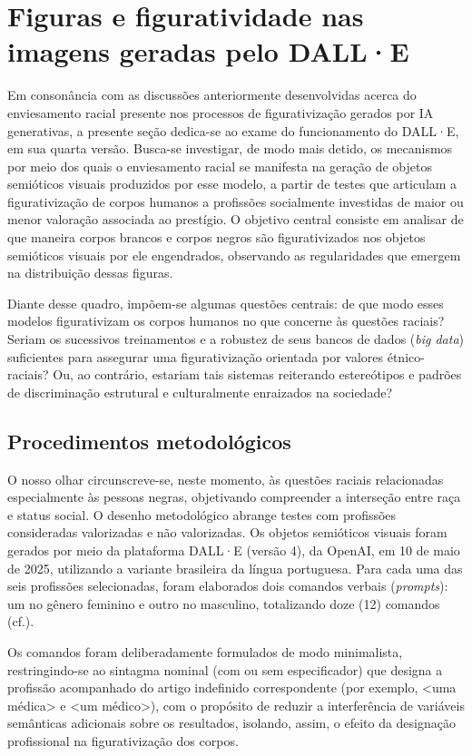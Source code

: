 \documentclass[portuguese]{textolivre}
\begin{document}
\section{Figuras e figuratividade nas imagens geradas pelo DALL·E}
Em consonância com as discussões anteriormente desenvolvidas acerca do enviesamento racial presente nos processos de figurativização gerados por IA generativas, a presente seção dedica-se ao exame do funcionamento do DALL·E, em sua quarta versão. Busca-se investigar, de modo mais detido, os mecanismos por meio dos quais o enviesamento racial se manifesta na geração de objetos semióticos visuais produzidos por esse modelo, a partir de testes que articulam a figurativização de corpos humanos a profissões socialmente investidas de maior ou menor valoração associada ao prestígio. O objetivo central consiste em analisar de que maneira corpos brancos e corpos negros são figurativizados nos objetos semióticos visuais por ele engendrados, observando as regularidades que emergem na distribuição dessas figuras.

Diante desse quadro, impõem-se algumas questões centrais: de que modo esses modelos figurativizam os corpos humanos no que concerne às questões raciais? Seriam os sucessivos treinamentos e a robustez de seus bancos de dados (\textit{big data}) suficientes para assegurar uma figurativização orientada por valores étnico-raciais? Ou, ao contrário, estariam tais sistemas reiterando estereótipos e padrões de discriminação estrutural e culturalmente enraizados na sociedade?


\subsection{Procedimentos metodológicos}

O nosso olhar circunscreve-se, neste momento, às questões raciais relacionadas especialmente às pessoas negras, objetivando compreender a interseção entre raça e status social. O desenho metodológico abrange testes com profissões consideradas valorizadas e não valorizadas. Os objetos semióticos visuais foram gerados por meio da plataforma DALL·E (versão 4), da OpenAI, em 10 de maio de 2025, utilizando a variante brasileira da língua portuguesa. Para cada uma das seis profissões selecionadas, foram elaborados dois comandos verbais (\textit{prompts}): um no gênero feminino e outro no masculino, totalizando doze (12) comandos (cf.).

Os comandos foram deliberadamente formulados de modo minimalista, restringindo-se ao sintagma nominal (com ou sem especificador) que designa a profissão acompanhado do artigo indefinido correspondente (por exemplo, <uma médica> e <um médico>), com o propósito de reduzir a interferência de variáveis semânticas adicionais sobre os resultados, isolando, assim, o efeito da designação profissional na figurativização dos corpos.
\end{document}
